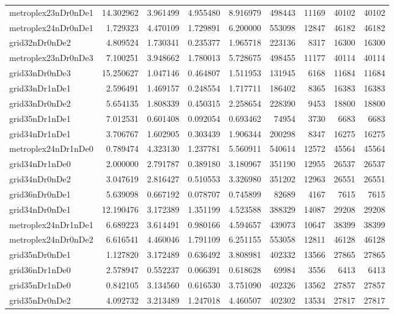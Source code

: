 \documentclass[../../../thesis.tex]{subfiles}
\begin{document}
\begin{longtable}{|l|r|r|r|r|r|r|r|r|}
metroplex23nDr0nDe1 & 14.302962 & 3.961499 & 4.955480 & 8.916979 & 498443 & 11169 & 40102 & 40102 \\
metroplex24nDr0nDe1 & 1.729323 & 4.470109 & 1.729891 & 6.200000 & 553098 & 12847 & 46182 & 46182 \\
grid32nDr0nDe2 & 4.809524 & 1.730341 & 0.235377 & 1.965718 & 223136 & 8317 & 16300 & 16300 \\
metroplex23nDr0nDe3 & 7.100251 & 3.948662 & 1.780013 & 5.728675 & 498455 & 11177 & 40114 & 40114 \\
grid33nDr0nDe3 & 15.250627 & 1.047146 & 0.464807 & 1.511953 & 131945 & 6168 & 11684 & 11684 \\
grid33nDr1nDe1 & 2.596491 & 1.469157 & 0.248554 & 1.717711 & 186402 & 8365 & 16383 & 16383 \\
grid33nDr0nDe2 & 5.654135 & 1.808339 & 0.450315 & 2.258654 & 228390 & 9453 & 18800 & 18800 \\
grid35nDr1nDe1 & 7.012531 & 0.601408 & 0.092054 & 0.693462 & 74954 & 3730 & 6683 & 6683 \\
grid34nDr1nDe1 & 3.706767 & 1.602905 & 0.303439 & 1.906344 & 200298 & 8347 & 16275 & 16275 \\
metroplex24nDr1nDe0 & 0.789474 & 4.323130 & 1.237781 & 5.560911 & 540614 & 12572 & 45564 & 45564 \\
grid34nDr1nDe0 & 2.000000 & 2.791787 & 0.389180 & 3.180967 & 351190 & 12955 & 26537 & 26537 \\
grid34nDr0nDe2 & 3.047619 & 2.816427 & 0.510553 & 3.326980 & 351202 & 12963 & 26551 & 26551 \\
grid36nDr0nDe1 & 5.639098 & 0.667192 & 0.078707 & 0.745899 & 82689 & 4167 & 7615 & 7615 \\
grid34nDr0nDe1 & 12.190476 & 3.172389 & 1.351199 & 4.523588 & 388329 & 14087 & 29208 & 29208 \\
metroplex24nDr1nDe1 & 6.689223 & 3.614491 & 0.980166 & 4.594657 & 439073 & 10647 & 38399 & 38399 \\
metroplex24nDr0nDe2 & 6.616541 & 4.460046 & 1.791109 & 6.251155 & 553058 & 12811 & 46128 & 46128 \\
grid35nDr0nDe1 & 1.127820 & 3.172489 & 0.636492 & 3.808981 & 402332 & 13566 & 27865 & 27865 \\
grid36nDr1nDe0 & 2.578947 & 0.552237 & 0.066391 & 0.618628 & 69984 & 3556 & 6413 & 6413 \\
grid35nDr1nDe0 & 0.842105 & 3.134560 & 0.616530 & 3.751090 & 402326 & 13562 & 27857 & 27857 \\
grid35nDr0nDe2 & 4.092732 & 3.213489 & 1.247018 & 4.460507 & 402302 & 13534 & 27817 & 27817 \\

\end{longtable}
\end{document}
